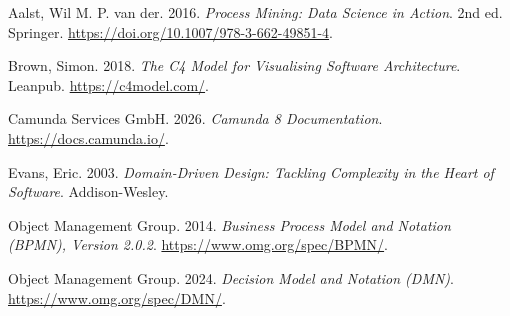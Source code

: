 \documentclass[
  english,
  11pt,
  a4paper,
]{scrbook}
\newlength{\cslhangindent}
\newenvironment{CSLReferences}[2] %
 {\begin{list}{}{%
  \setlength{\itemindent}{0pt}
  \setlength{\leftmargin}{0pt}
  \setlength{\parsep}{0pt}
  \ifodd #1
   \setlength{\leftmargin}{\cslhangindent}
   \setlength{\itemindent}{-1\cslhangindent}
  \fi
  \setlength{\itemsep}{#2\baselineskip}}}
 {\end{list}}
\begin{document}
\protect{}\label{refs}
\begin{CSLReferences}{1}{1}
Aalst, Wil M. P. van der. 2016. \emph{Process Mining: Data Science in
Action}. 2nd ed. Springer.
\url{https://doi.org/10.1007/978-3-662-49851-4}.

Brown, Simon. 2018. \emph{The {C4} Model for Visualising Software
Architecture}. Leanpub. \url{https://c4model.com/}.

Camunda Services GmbH. 2026. \emph{Camunda 8 Documentation}.
\url{https://docs.camunda.io/}.

Evans, Eric. 2003. \emph{Domain-Driven Design: Tackling Complexity in
the Heart of Software}. Addison-Wesley.

Object Management Group. 2014. \emph{Business Process Model and Notation
({BPMN}), Version 2.0.2}. \url{https://www.omg.org/spec/BPMN/}.

Object Management Group. 2024. \emph{Decision Model and Notation
({DMN})}. \url{https://www.omg.org/spec/DMN/}.

\end{CSLReferences}


\backmatter
\end{document}
